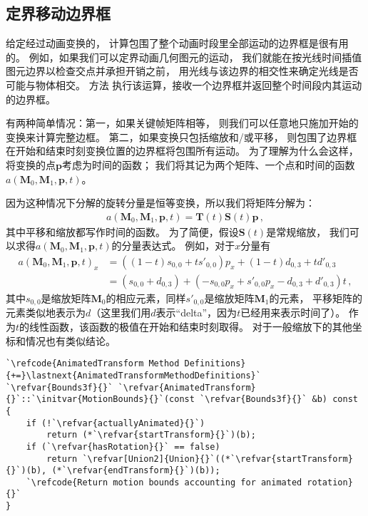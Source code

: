 \subsection{定界移动边界框}\label{sub:定界移动边界框}
给定经过动画变换的，
计算包围了整个动画时段里全部运动的边界框是很有用的。
例如，如果我们可以定界动画几何图元的运动，
我们就能在按光线时间插值图元边界以检查交点并承担开销之前，
用光线与该边界的相交性来确定光线是否可能与物体相交。
方法
执行该运算，接收一个边界框并返回整个时间段内其运动的边界框。

有两种简单情况：第一，如果关键帧矩阵相等，
则我们可以任意地只施加开始的变换来计算完整边框。
第二，如果变换只包括缩放和/或平移，
则包围了边界框在开始和结束时刻变换位置的边界框将包围所有运动。
为了理解为什么会这样，将变换的点$\bm p$考虑为时间的函数；
我们将其记为两个矩阵、一个点和时间的函数$a(\bm M_0,\bm M_1,\bm p,t)$。

因为这种情况下分解的旋转分量是恒等变换，所以我们将矩阵分解为：
\begin{align*}
    a(\bm M_0,\bm M_1,\bm p,t)=\bm T(t)\bm S(t)\bm p\, ,
\end{align*}
其中平移和缩放都写作时间的函数。
为了简便，假设$\bm S(t)$是常规缩放，
我们可以求得$a(\bm M_0,\bm M_1,\bm p,t)$的分量表达式。
例如，对于$x$分量有
\begin{align*}
    a(\bm M_0,\bm M_1,\bm p,t)_x & =((1-t)s_{0,0}+ts'_{0,0})p_x+(1-t)d_{0,3}+td'_{0,3}                \\
                                 & =(s_{0,0}+d_{0,3})+(-s_{0,0}p_x+s'_{0,0}p_x-d_{0,3}+d'_{0,3})t\, ,
\end{align*}
其中$s_{0,0}$是缩放矩阵$\bm M_0$的相应元素，同样$s'_{0,0}$是缩放矩阵$\bm M_1$的元素，
平移矩阵的元素类似地表示为$d$（这里我们用$d$表示“delta”，因为$t$已经用来表示时间了）。
作为$t$的线性函数，该函数的极值在开始和结束时刻取得。
对于一般缩放下的其他坐标和情况也有类似结论。
\begin{lstlisting}
`\refcode{AnimatedTransform Method Definitions}{+=}\lastnext{AnimatedTransformMethodDefinitions}`
`\refvar{Bounds3f}{}` `\refvar{AnimatedTransform}{}`::`\initvar{MotionBounds}{}`(const `\refvar{Bounds3f}{}` &b) const {
    if (!`\refvar{actuallyAnimated}{}`)
        return (*`\refvar{startTransform}{}`)(b);
    if (`\refvar{hasRotation}{}` == false)
        return `\refvar[Union2]{Union}{}`((*`\refvar{startTransform}{}`)(b), (*`\refvar{endTransform}{}`)(b));
    `\refcode{Return motion bounds accounting for animated rotation}{}`
}
\end{lstlisting}

